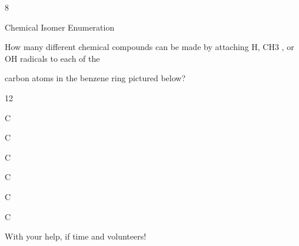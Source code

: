 \documentclass[a4paper,portrait,12pt]{article}
\begin{document}
8





\begin{flushleft}
Chemical Isomer Enumeration
\end{flushleft}





\begin{flushleft}
How many different chemical compounds can be made by attaching H, CH3 , or OH radicals to each of the
\end{flushleft}


\begin{flushleft}
carbon atoms in the benzene ring pictured below?
\end{flushleft}





12





\begin{flushleft}
\newpage
C
\end{flushleft}





\begin{flushleft}
C
\end{flushleft}





\begin{flushleft}
C
\end{flushleft}





\begin{flushleft}
C
\end{flushleft}





\begin{flushleft}
C
\end{flushleft}





\begin{flushleft}
C
\end{flushleft}





\begin{flushleft}
With your help, if time and volunteers!
\end{flushleft}
\end{document}
